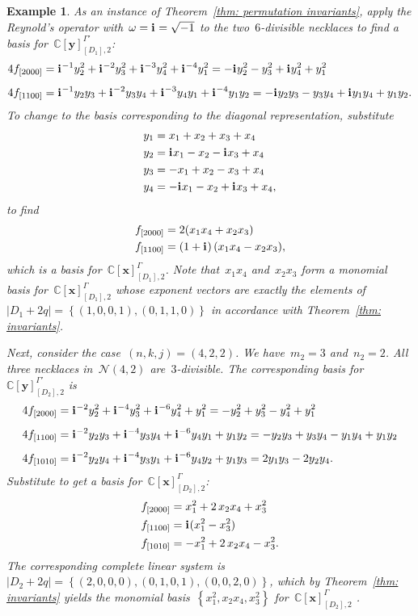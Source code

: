 \documentclass{amsart}
\newtheorem{Example}[thm]{Example}
\newenvironment{example}
  {\begin{Example}\rm}{\end{Example}}
\newcommand{\I}{\mathbf{i}\mkern1mu}
\newcommand{\C}{\mathbb{C}}
\newcommand{\polyring}{\C[\mathbf{x}]}
\newcommand{\polyringy}{\C[\mathbf{y}]}
\newcommand{\neck}{\mathcal{N}}
\begin{document}
\begin{example}
\noindent As an instance of Theorem~\ref{thm: permutation invariants}, apply the
Reynold's operator with~$\omega=\I=\sqrt{-1}$ to the two~$6$-divisible necklaces
to find a basis for~$\polyringy_{[D_1],2}^{\Gamma'}$:
\begin{align*}
  4f_{[2000]} &= \I^{-1}y_2^2+\I^{-2} y_3^{2}+\I^{-3}y_4^2+\I^{-4}y_1^2=
  -\I y_2^2-y_3^2+\I y_4^2+ y_1^2\\[5pt]
  4f_{[1100]}&=\I^{-1}y_2y_3+\I^{-2}y_3y_4+\I^{-3}y_4y_1+\I^{-4}y_1y_2
  =-\I y_2y_3-y_3y_4+\I y_1y_4+y_1y_2.
\end{align*}
To change to the basis corresponding to the diagonal representation, substitute
\begin{align*}
  y_1 &= x_1+x_2+x_3+x_4\\
  y_2 &= \I x_1- x_2-\I x_3 +x_4\\
  y_3 &= -x_1+ x_2-x_3+x_4\\
  y_4 &= -\I x_1- x_2+\I x_3+x_4,
\end{align*}
to find
\begin{align*}
  f_{[2000]}&= 2(x_{1} x_{4} + x_{2} x_{3})\\
  f_{[1100]}&= \left(1+\I\right)(x_{1} x_{4} -  x_{2} x_{3}),
\end{align*}
which is a basis for~$\polyring_{[D_1],2}^{\Gamma}$.  Note that~$x_1x_4$
and~$x_2x_3$ form a monomial basis for~$\polyring_{[D_1],2}^{\Gamma}$ whose
exponent vectors are exactly the elements
of~$|D_1+2q|=\left\{(1,0,0,1),(0,1,1,0) \right\}$ in accordance with
Theorem~\ref{thm: invariants}. 

Next, consider the case~$(n,k,j)=(4,2,2)$.  We have~$m_2=3$ and~$n_2=2$.  All
three necklaces in~$\neck(4,2)$ are~$3$-divisible.  The corresponding basis
for~$\polyringy_{[D_2],2}^{\Gamma'}$ is
\begin{align*}
  4f_{[2000]} &= \I^{-2}y_2^2+\I^{-4} y_3^{2}+\I^{-6}y_4^2+y_1^2=
  -y_2^2+y_3^2- y_4^2+ y_1^2\\[5pt]
  4f_{[1100]}&=\I^{-2}y_2y_3+\I^{-4}y_3y_4+\I^{-6}y_4y_1+y_1y_2
  =- y_2y_3+y_3y_4- y_1y_4+y_1y_2\\[5pt]
  4f_{[1010]}&=\I^{-2}y_2y_4+\I^{-4}y_3y_1+\I^{-6}y_4y_2+y_1y_3
  =2y_1y_3- 2y_2y_4.
\end{align*}
Substitute to get a basis for~$\polyring_{[D_2],2}^{\Gamma}$:
\begin{align*}
  f_{[2000]}&=x_{1}^{2}+ 2 \, x_{2} x_{4}+  x_{3}^{2}  \\
  f_{[1100]}&= \I (x_{1}^{2} -  x_{3}^{2})\\
  f_{[1010]}&= -x_{1}^{2} + 2 \, x_{2} x_{4}- x_{3}^{2}.
\end{align*}
The corresponding complete linear system
is~$|D_2+2q|=\left\{(2,0,0,0),(0,1,0,1),(0,0,2,0) \right\}$, which by
Theorem~\ref{thm: invariants} yields the monomial
basis~$\left\{x_1^2,x_2x_4,x_3^2\right\}$ for~$\polyring^{\Gamma}_{[D_2],2}$ .
\end{example}
\end{document}
